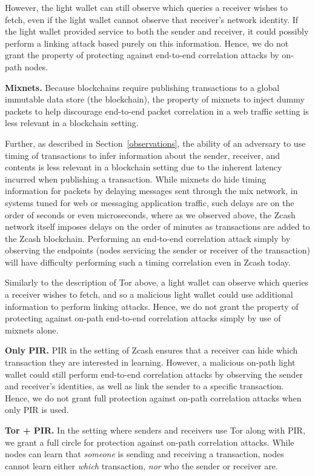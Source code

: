\documentclass{article}
\begin{document}
However, the light wallet can still observe which queries a receiver wishes to
fetch, even if the light wallet cannot observe that receiver's network
identity. If the light wallet provided service to both the sender and receiver,
it could possibly perform a linking attack based purely on this information.
Hence, we do not grant the property of protecting against end-to-end
correlation attacks by on-path nodes.

\textbf{Mixnets.}
Because blockchains require publishing transactions to a global immutable data
store (the blockchain), the property of mixnets to inject dummy packets to help
discourage end-to-end packet correlation in a web traffic setting is less
relevant in a blockchain setting.

Further, as described in Section~\ref{observations}, the ability of an adversary to use timing of
transactions to infer information about the sender, receiver, and
contents is less relevant in a blockchain setting due to the inherent latency
incurred when publishing a transaction.
While mixnets do hide timing information for packets by
delaying messages sent through the mix network, in systems tuned for web or
messaging application traffic, such
delays are on the order of seconds or even microseconds, where as we observed
above, the Zcash network itself imposes delays on the order of minutes as
transactions are added to the Zcash blockchain. Performing an end-to-end
correlation attack simply by observing the endpoints (nodes servicing the
sender or receiver of the transaction) will have difficulty performing such a
timing correlation even in Zcash today.

Similarly to the description of Tor above, a light wallet can observe which
queries a receiver wishes to fetch, and so a malicious light wallet could use
additional information to perform linking attacks. Hence, we do not grant the
property of protecting against on-path end-to-end correlation attacks simply by
use of mixnets alone.

\textbf{Only PIR.}
PIR in the setting of Zcash ensures that a receiver can hide which transaction
they are interested in learning. However, a malicious on-path light wallet
could still perform end-to-end correlation attacks by observing the sender and
receiver's identities, as well as link the sender to a specific transaction.
Hence, we do not grant full protection against on-path correlation attacks when
only PIR is used.

\textbf{Tor + PIR.}
In the setting where senders and receivers use Tor along with PIR, we grant a
full circle for protection against on-path correlation
attacks.
While nodes can learn that \emph{someone} is sending and receiving a
transaction, nodes cannot learn either \emph{which} transaction, \emph{nor} who
the sender or receiver are.
\end{document}
